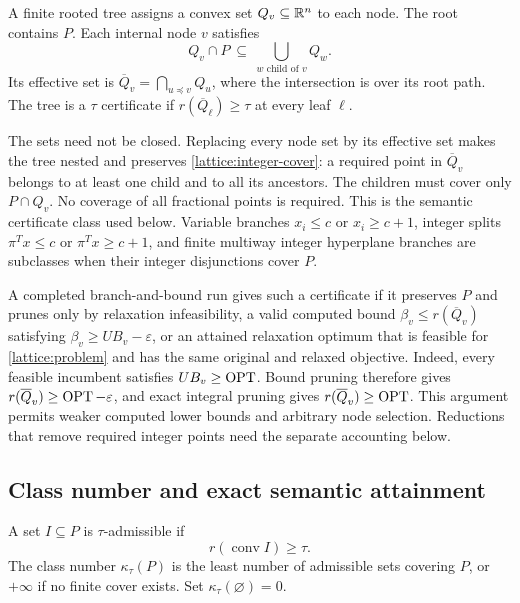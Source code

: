 \begin{definition}
\label{lattice:tree-definition}
A finite rooted tree assigns a convex set $Q_v\subseteq\mathbb{R}^n$ to each node.
The root contains $P$. Each internal node $v$ satisfies
\begin{equation}
 Q_v\cap P\ \subseteq\ \bigcup_{w\text{ child of }v}Q_w.
 \label{lattice:integer-cover}
\end{equation}
Its effective set is $\overline Q_v=\bigcap_{u\preceq v}Q_u$, where the
intersection is over its root path. The tree is a $\tau$ certificate if
$r(\overline Q_\ell)\ge\tau$ at every leaf $\ell$.
\end{definition}

The sets need not be closed. Replacing every node set by its effective set
makes the tree nested and preserves \eqref{lattice:integer-cover}: a required
point in $\overline Q_v$ belongs to at least one child and to all its
ancestors. The children must cover only $P\cap Q_v$. No coverage of all
fractional points is required. This is the semantic certificate class used
below. Variable branches $x_i\le c$ or $x_i\ge c+1$, integer splits
$\pi^Tx\le c$ or $\pi^Tx\ge c+1$, and finite multiway integer hyperplane
branches are subclasses when their integer disjunctions cover $P$.

A completed branch-and-bound run gives such a certificate if it preserves
$P$ and prunes only by relaxation infeasibility, a valid computed bound
$\beta_v\le r(\overline Q_v)$ satisfying $\beta_v\ge UB_v-\varepsilon$, or
an attained relaxation optimum that is feasible for
\eqref{lattice:problem} and has the same original and relaxed objective.
Indeed, every feasible incumbent satisfies $UB_v\ge\operatorname{OPT}$. Bound pruning
therefore gives $r(\overline Q_v)\ge\operatorname{OPT}-\varepsilon$, and exact integral
pruning gives $r(\overline Q_v)\ge\operatorname{OPT}$. This argument permits weaker
computed lower bounds and arbitrary node selection. Reductions that remove
required integer points need the separate accounting below.

\subsection{Class number and exact semantic attainment}

\begin{definition}
\label{lattice:class-definition}
A set $I\subseteq P$ is $\tau$-admissible if
\begin{equation}
 r(\operatorname{conv}I)\ge\tau.
 \label{lattice:admissibility}
\end{equation}
The class number $\kappa_\tau(P)$ is the least number of admissible sets
covering $P$, or $+\infty$ if no finite cover exists. Set
$\kappa_\tau(\varnothing)=0$.
\end{definition}


